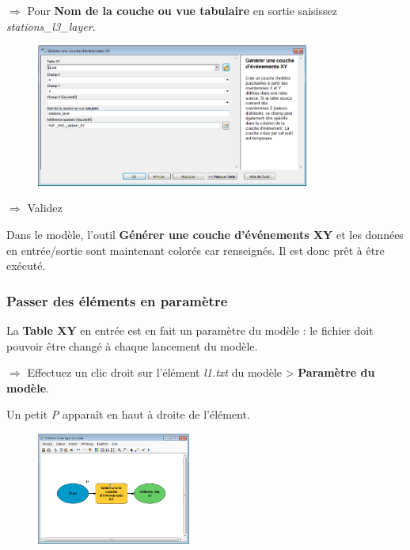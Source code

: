 \documentclass[11pt]{article}
\newcommand{\action}{$\Rightarrow$ }
\begin{document}
\action Pour \textbf{Nom de la couche ou vue tabulaire} en sortie saisissez \textit{stations\_l3\_layer}.
\begin{figure}[H]
	\center \includegraphics[width=0.8\textwidth]{img/td3/modelbuilder_creation-2.png}\\
\end{figure}

\action Validez

Dans le modèle, l'outil \textbf{Générer une couche d'événements XY} et les données en entrée/sortie sont maintenant colorés car renseignés. Il est donc prêt à être exécuté.


\subsubsection{Passer des éléments en paramètre}
La \textbf{Table XY} en entrée est en fait un paramètre du modèle : le fichier doit pouvoir être changé à chaque lancement du modèle.

\action Effectuez un clic droit sur l'élément \textit{l1.txt} du modèle > \textbf{Paramètre du modèle}.

Un petit \textit{P} apparaît en haut à droite de l'élément.
\begin{figure}[H]
	\center \includegraphics[width=0.45\textwidth]{img/td3/modelbuilder_creation-3.png}\\
\end{figure}
\end{document}
